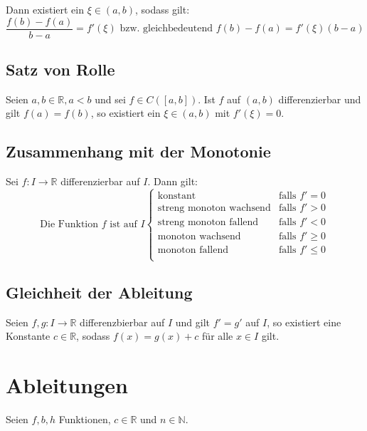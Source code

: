 		Dann existiert ein $ \xi \in (a, b) $, sodass gilt:
		\begin{equation*}
			\frac{f(b) - f(a)}{b - a} = f'(\xi) \text{ bzw. gleichbedeutend } f(b) - f(a) = f'(\xi)(b - a)
		\end{equation*}

	\subsection{Satz von Rolle}
		Seien $ a, b \in \mathbb{R}, a < b $ und sei $ f \in C([a, b]) $. Ist $ f $ auf $ (a, b) $ differenzierbar und gilt $ f(a) = f(b) $, so existiert ein $ \xi \in (a, b) $ mit $ f'(\xi) = 0 $.

	\subsection{Zusammenhang mit der Monotonie}
		Sei $ f : I \rightarrow \mathbb{R} $ differenzierbar auf $ I $. Dann gilt:
		\begin{equation*}
			\text{Die Funktion } f \text{ ist auf } I
			\begin{cases}
				\text{konstant}                & \text{falls } f' = 0    \\
				\text{streng monoton wachsend} & \text{falls } f' > 0    \\
				\text{streng monoton fallend}  & \text{falls } f' < 0    \\
				\text{monoton wachsend}        & \text{falls } f' \geq 0 \\
				\text{monoton fallend}         & \text{falls } f' \leq 0 \\
			\end{cases}
		\end{equation*}

	\subsection{Gleichheit der Ableitung}
		Seien $ f, g : I \rightarrow \mathbb{R} $ differenzbierbar auf $ I $ und gilt $ f' = g' $ auf $ I $, so existiert eine Konstante $ c \in \mathbb{R} $, sodass $ f(x) = g(x) + c $ für alle $ x \in I $ gilt.

\section{Ableitungen}
	Seien $ f, b, h $ Funktionen, $ c \in \mathbb{R} $ und $ n \in \mathbb{N} $.

